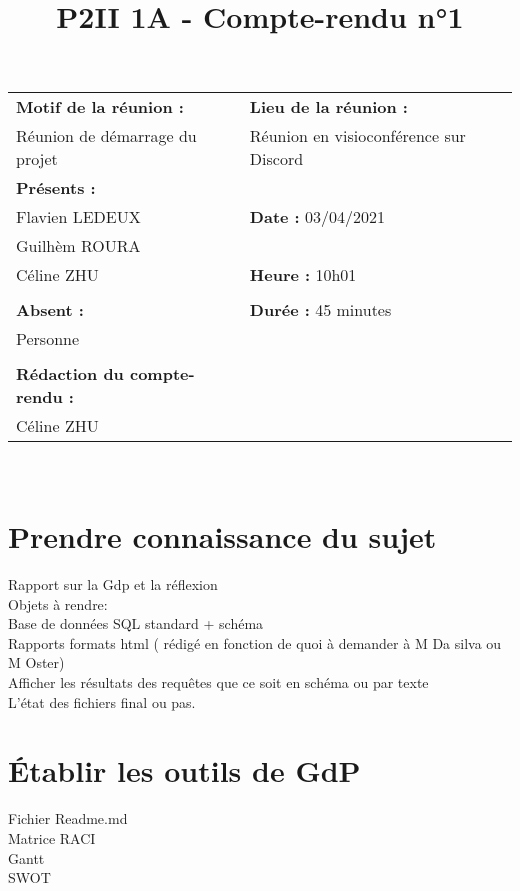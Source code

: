 \title{P2II 1A - Compte-rendu n°1}
\begin{center}
        \begin{tabular}{|l|l|}
        \hline
   
\textbf{Motif de la réunion :}&\textbf{Lieu de la réunion :}\\

Réunion de démarrage du projet&Réunion en visioconférence sur Discord\\


        \hline
        \textbf{Présents :}&\\

Flavien LEDEUX&\textbf{Date :} 03/04/2021\\

Guilhèm ROURA&\\
Céline ZHU&\textbf{Heure :} 10h01\\

&\\
\textbf{Absent :}&\textbf{Durée :} 45 minutes\\

Personne&\\
&\\
\textbf{Rédaction du compte-rendu :}&\\

Céline ZHU&\\

        \hline
        \end{tabular}\\
        \end{center}
\minitoc


\section{Prendre connaissance du sujet}

Rapport sur la Gdp et la réflexion\\
    Objets à rendre:\\
    Base de données SQL standard + schéma\\
    Rapports formats html ( rédigé en fonction de quoi à demander à M Da silva ou M Oster)\\
Afficher les résultats des requêtes que ce soit en schéma ou par texte\\
L’état des fichiers final ou pas.\\
\section{Établir les outils de GdP}
Fichier Readme.md\\
Matrice RACI\\
Gantt \\
SWOT\\
